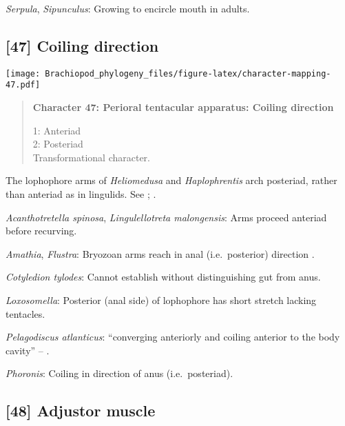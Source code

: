 \documentclass[openany]{book}
\theoremstyle{definition}
\theoremstyle{definition}
\theoremstyle{definition}
\theoremstyle{remark}
\begin{document}
\hypertarget{Serpula-coding-46}{}
\emph{Serpula}, \emph{Sipunculus}: Growing to encircle mouth in adults.

\subsection*{{[}47{]} Coiling direction}\label{coiling-direction}

\texttt{[image: Brachiopod\_phylogeny\_files/figure-latex/character-mapping-47.pdf]}

\begin{quote}
\textbf{Character 47: Perioral tentacular apparatus: Coiling direction}

1: Anteriad\\
2: Posteriad\\
Transformational character.
\end{quote}

The lophophore arms of \emph{Heliomedusa} and \emph{Haplophrentis} arch
posteriad, rather than anteriad as in lingulids. See
\citet{Zhang2009Architectureand}; \citet{Moysiuk2017Hyolithsare}.

\hypertarget{Acanthotretella_spinosa-coding-47}{}
\emph{Acanthotretella spinosa}, \emph{Lingulellotreta malongensis}: Arms
proceed anteriad before recurving.

\hypertarget{Amathia-coding-47}{}
\emph{Amathia}, \emph{Flustra}: Bryozoan arms reach in anal
(i.e.~posterior) direction \citep{Shunkina2015}.

\hypertarget{Cotyledion_tylodes-coding-47}{}
\emph{Cotyledion tylodes}: Cannot establish without distinguishing gut
from anus.

\hypertarget{Loxosomella-coding-47}{}
\emph{Loxosomella}: Posterior (anal side) of lophophore has short
stretch lacking tentacles.

\hypertarget{Pelagodiscus_atlanticus-coding-47}{}
\emph{Pelagodiscus atlanticus}: ``converging anteriorly and coiling
anterior to the body cavity'' -- \citet{Zhang2009Architectureand}.

\hypertarget{Phoronis-coding-47}{}
\emph{Phoronis}: Coiling in direction of anus (i.e.~posteriad).

\subsection*{{[}48{]} Adjustor muscle}\label{adjustor-muscle}
\end{document}
